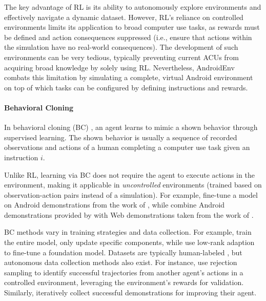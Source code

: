 The key advantage of RL is its ability to autonomously explore environments and effectively navigate a dynamic dataset. However, RL's reliance on controlled environments limits its application to broad computer use tasks, as rewards must be defined and action consequences suppressed (i.e., ensure that actions within the simulation have no real-world consequences). The development of such environments can be very tedious, typically preventing current ACUs from acquiring broad knowledge by solely using RL.
Nevertheless, AndroidEnv \citep{toyama_androidenv_2021} combats this limitation by simulating a complete, virtual Android environment on top of which tasks can be configured by defining instructions and rewards.


\paragraph{Behavioral Cloning}\label{sec:environment_adaption_bc}

In behavioral cloning (BC) \citep{pomerleau_alvinn_1988}, an agent learns to mimic a shown behavior through supervised learning.
The shown behavior is usually a sequence of recorded observations and actions of a human completing a computer use task given an instruction \nolinebreak$i$.

Unlike RL, learning via BC does not require the agent to execute actions in the environment, making it applicable in \emph{uncontrolled} environments (trained based on observation-action pairs instead of a simulation). 
For example, \citet{zhang_you_2024} fine-tune a model on Android demonstrations from the work of \citet{rawles_android_2023}, while \citet{hong_cogagent_2024} combine Android demonstrations provided by \citet{rawles_android_2023} with Web demonstrations taken from the work of \citet{deng_mind2web_2023}.

BC methods vary in training strategies and data collection.
For example, \citet{gur_understanding_2023} train the entire model, \citet{hong_cogagent_2024} only update specific components, while \citet{li_effects_2024} use low-rank adaption \citep{hu_lora_2021} to fine-tune a foundation model.
Datasets are typically human-labeled , but autonomous data collection methods also exist. For instance, \citet{furuta_multimodal_2024} use rejection sampling to identify successful trajectories from another agent's actions in a controlled environment, leveraging the environment’s rewards for validation. Similarly, \citet{lai_autowebglm_2024} iteratively collect successful demonstrations for improving their agent.

